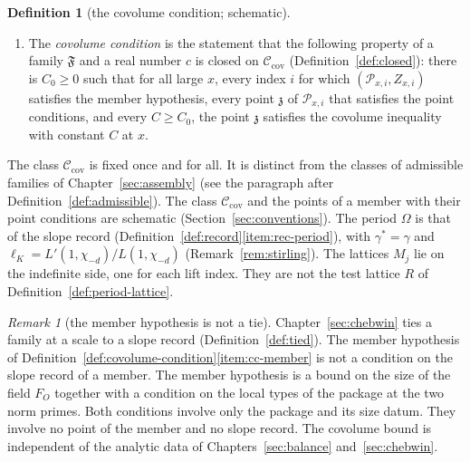 \documentclass[11pt]{amsbook}
\theoremstyle{plain}
\theoremstyle{definition}
\newtheorem{definition}[theorem]{Definition}
\theoremstyle{remark}
\newtheorem{remark}[theorem]{Remark}
\numberwithin{equation}{section}
\numberwithin{figure}{chapter}
\numberwithin{table}{chapter}
\newcommand{\Fam}{\mathfrak{F}}
\begin{document}
\begin{definition}[the covolume condition; schematic]
\begin{enumerate}[label=(\arabic*)]
{inequality} with constant $C$ at $x$ if for every lift index $j$
\[
\frac{\log\operatorname{covol}(M_j)}{\deg}\le\sum_{\rho}\bigl(p_j-q_j
\bigr)\,w(j,\rho)\log\Omega+C\,B_0\log\log x,
\]
where $\log\operatorname{covol}(M_j)$ is the normalised logarithmic
covolume of $M_j$, $\deg$ is the degree of the point, the sum runs over
$\rho\in\Phi$, and $B_0$ is the size quantity of the member
(Definition~\ref{def:size-datum}).
\item The \emph{covolume condition} is the statement that the
following property of a family $\Fam$ and a real number $c$ is closed
on $\mathcal C_{\mathrm{cov}}$ (Definition~\ref{def:closed}): there is
$C_0\ge0$ such that for all large $x$, every index $i$ for which
$(\mathcal P_{x,i},Z_{x,i})$ satisfies the member hypothesis, every
point $\mathfrak z$ of $\mathcal P_{x,i}$ that satisfies the point
conditions, and every $C\ge C_0$, the point $\mathfrak z$ satisfies the
covolume inequality with constant $C$ at $x$.
\end{enumerate}
\end{definition}

\noindent The class $\mathcal C_{\mathrm{cov}}$ is fixed once and for
all. It is distinct from the classes of admissible families of
Chapter~\ref{sec:assembly} (see the paragraph after
Definition~\ref{def:admissible}). The class $\mathcal
C_{\mathrm{cov}}$ and the points of a member with their point
conditions are schematic (Section~\ref{sec:conventions}). The period
$\Omega$ is that of the slope
record (Definition~\ref{def:record}\ref{item:rec-period}), with
$\gamma^*=\gamma$ and
$\ell_K=L'(1,\chi_{-d})/L(1,\chi_{-d})$ (Remark~\ref{rem:stirling}).
The lattices $M_j$ lie on the indefinite side, one for each lift index.
They are not the test lattice $R$ of
Definition~\ref{def:period-lattice}.

\begin{remark}[the member hypothesis is not a tie]
\label{rem:member-hyp}
Chapter~\ref{sec:chebwin} ties a family at a scale to a slope record
(Definition~\ref{def:tied}). The member hypothesis of
Definition~\ref{def:covolume-condition}\ref{item:cc-member} is not a
condition on the slope record of a member. The member hypothesis is a bound on
the size of the field $F_O$ together with a condition on the local
types of the package at the two norm primes. Both conditions involve
only the package and its size datum. They involve no point of the
member and no slope record. The
covolume bound is independent of the analytic data of
Chapters~\ref{sec:balance} and~\ref{sec:chebwin}.
\end{remark}
\end{document}
